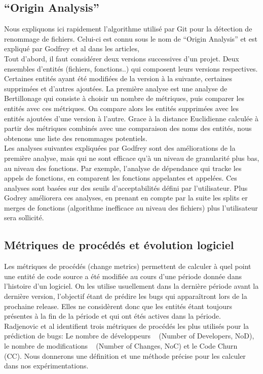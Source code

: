 \subsection{``Origin Analysis''}
Nous expliquons ici rapidement l'algorithme utilisé par Git pour la détection de renommage de fichiers. Celui-ci est connu sous le nom de ``Origin Analysis'' et est expliqué par Godfrey et al dans les articles, ~\cite{tu_integrated_2002,godfrey_tracking_2002,godfrey_using_2005}\\
Tout d'abord, il faut considérer deux versions successives d'un projet. Deux ensembles d'entités (fichiers, fonctions..) qui composent leurs versions respectives. Certaines entités ayant été modifiées de la version à la suivante, certaines supprimées et d'autres ajoutées.
La première analyse est une analyse de Bertillonage qui consiste à choisir un nombre de métriques, puis comparer les entités avec ces métriques. On compare alors les entités supprimées avec les entités ajoutées d'une version à l'autre. Grace à la distance Euclidienne calculée à partir des métriques combinés avec une comparaison des noms des entités, nous obtenons une liste des renommages potentiels.\\
Les analyses suivantes expliquées par Godfrey sont des améliorations de la première analyse, mais qui ne sont efficace qu'à un niveau de granularité plus bas, au niveau des fonctions. Par exemple, l'analyse de dépendance qui tracke les appels de fonctions, en comparent les fonctions appelantes et appelées. Ces analyses sont basées sur des seuils d'acceptabilités défini par l'utilisateur. Plus Godrey améliorera ces analyses, en prenant en compte par la suite les splits er merges de fonctions (algorithme inefficace au niveau des fichiers) plus l'utilisateur sera sollicité. \\

\subsection{Métriques de procédés et évolution logiciel}
Les métriques de procédés (change metrics) permettent de calculer à quel point une entité de code source a été modifiée au cours d'une période donnée dans l'histoire d'un logiciel. On les utilise usuellement dans la dernière période avant la dernière version, l'objectif étant de prédire les bugs qui apparaîtront lors de la prochaine release. Elles ne considèrent donc que les entités étant toujours présentes à la fin de la période et qui ont étés actives dans la période.\\
Radjenovic et al \cite{radjenovic_software_2013} identifient trois métriques de procédés les plus utilisés pour la prédiction de bugs: Le nombre de développeurs ~\cite{weyuker_too_2008} (Number of Developers, NoD), le nombre de modifications ~\cite{graves_predicting_2000} (Number of Changes, NoC) et le Code Churn ~\cite{munson_code_1998} (CC). Nous donnerons une définition et une méthode précise pour les calculer dans nos expérimentations.\\

